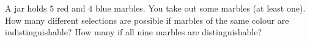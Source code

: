 A jar holds $5$ red and $4$ blue marbles. You take out some marbles (at least one). How many different selections are possible if marbles of the same colour are indistinguishable? How many if all nine marbles are distinguishable?
